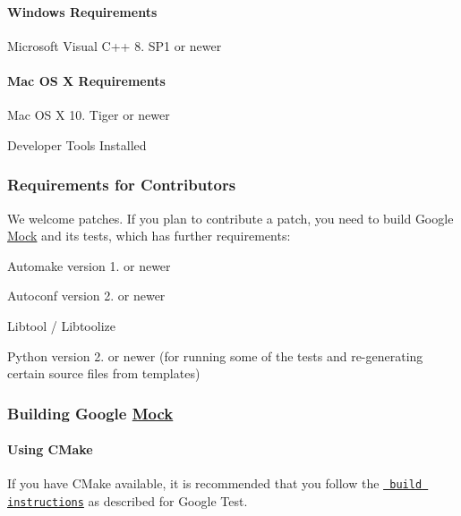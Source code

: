 \paragraph*{Windows Requirements}


\begin{DoxyItemize}
\item Microsoft Visual C++ 8. S\+P1 or newer
\end{DoxyItemize}

\paragraph*{Mac OS X Requirements}


\begin{DoxyItemize}
\item Mac OS X 10. Tiger or newer
\item Developer Tools Installed
\end{DoxyItemize}

\subsubsection*{Requirements for Contributors}

We welcome patches. If you plan to contribute a patch, you need to build Google \mbox{\hyperlink{classMock}{Mock}} and its tests, which has further requirements\+:


\begin{DoxyItemize}
\item Automake version 1. or newer
\item Autoconf version 2. or newer
\item Libtool / Libtoolize
\item Python version 2. or newer (for running some of the tests and re-\/generating certain source files from templates)
\end{DoxyItemize}

\subsubsection*{Building Google \mbox{\hyperlink{classMock}{Mock}}}

\paragraph*{Using C\+Make}

If you have C\+Make available, it is recommended that you follow the \href{../googletest/README.md\#using-cmake}{\texttt{ build instructions}} as described for Google Test.

